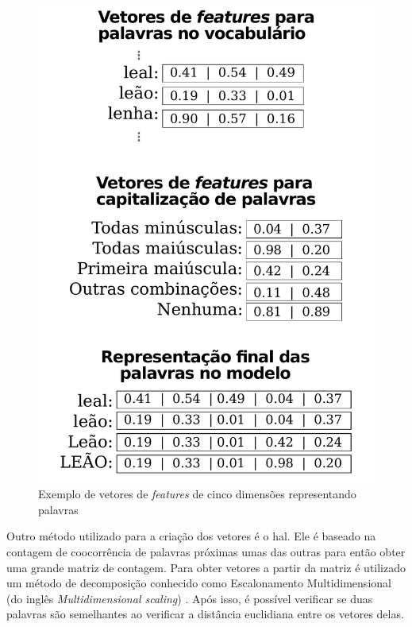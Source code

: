 \begin{figure}[htb]
  \caption{Exemplo de vetores de \textit{features} de cinco dimensões representando palavras} \label{fig:exemplofeaturevectors}
  \begin{center}
      \includegraphics[scale=0.35]{img/exemplofeaturevectors.pdf}
  \end{center}
\end{figure}

Outro método utilizado para a criação dos vetores é o \ac{hal}. Ele é baseado na contagem de coocorrência de palavras próximas umas das outras para então obter uma grande matriz de contagem. Para obter vetores a partir da matriz é utilizado um método de decomposição conhecido como Escalonamento Multidimensional (do inglês \textit{Multidimensional scaling}) \cite{lund1996producing}. Após isso, é possível verificar se duas palavras são semelhantes ao verificar a distância euclidiana entre os vetores delas.

